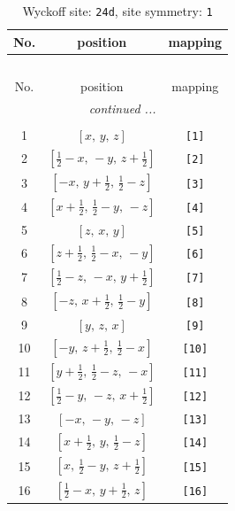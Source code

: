 \documentclass[fleqn,8pt]{jsarticle}
\begin{document}
\begin{longtable}{ccc}
\caption{Wyckoff site: {\tt 24d}, site symmetry: {\tt 1}}
 \\
 \hline \hline
No. & position & mapping \\ \hline \endfirsthead

\multicolumn{2}{l}{\tablename\ \thetable{}} \\
 \hline \hline
No. & position & mapping \\ \hline \endhead

 \hline \hline
\multicolumn{2}{r}{\footnotesize\it continued ...} \\ \endfoot

 \hline \hline
\multicolumn{2}{r}{} \\ \endlastfoot

1 & $\left[ x,\, y,\, z \right]$ & {\tt [1]} \\ \hline
2 & $\left[ \frac{1}{2} - x,\, - y,\, z + \frac{1}{2} \right]$ & {\tt [2]} \\ \hline
3 & $\left[ - x,\, y + \frac{1}{2},\, \frac{1}{2} - z \right]$ & {\tt [3]} \\ \hline
4 & $\left[ x + \frac{1}{2},\, \frac{1}{2} - y,\, - z \right]$ & {\tt [4]} \\ \hline
5 & $\left[ z,\, x,\, y \right]$ & {\tt [5]} \\ \hline
6 & $\left[ z + \frac{1}{2},\, \frac{1}{2} - x,\, - y \right]$ & {\tt [6]} \\ \hline
7 & $\left[ \frac{1}{2} - z,\, - x,\, y + \frac{1}{2} \right]$ & {\tt [7]} \\ \hline
8 & $\left[ - z,\, x + \frac{1}{2},\, \frac{1}{2} - y \right]$ & {\tt [8]} \\ \hline
9 & $\left[ y,\, z,\, x \right]$ & {\tt [9]} \\ \hline
10 & $\left[ - y,\, z + \frac{1}{2},\, \frac{1}{2} - x \right]$ & {\tt [10]} \\ \hline
11 & $\left[ y + \frac{1}{2},\, \frac{1}{2} - z,\, - x \right]$ & {\tt [11]} \\ \hline
12 & $\left[ \frac{1}{2} - y,\, - z,\, x + \frac{1}{2} \right]$ & {\tt [12]} \\ \hline
13 & $\left[ - x,\, - y,\, - z \right]$ & {\tt [13]} \\ \hline
14 & $\left[ x + \frac{1}{2},\, y,\, \frac{1}{2} - z \right]$ & {\tt [14]} \\ \hline
15 & $\left[ x,\, \frac{1}{2} - y,\, z + \frac{1}{2} \right]$ & {\tt [15]} \\ \hline
16 & $\left[ \frac{1}{2} - x,\, y + \frac{1}{2},\, z \right]$ & {\tt [16]} \\ \hline

\end{longtable}
\end{document}
